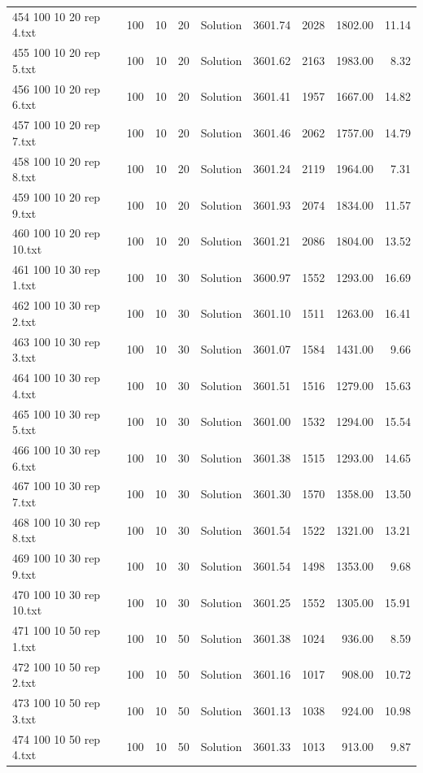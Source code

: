 \begin{longtable}{lrrllrrrr}
454 100 10 20 rep 4.txt & 100 & 10 & 20 & Solution & 3601.74 & 2028 & 1802.00 & 11.14\\
455 100 10 20 rep 5.txt & 100 & 10 & 20 & Solution & 3601.62 & 2163 & 1983.00 &  8.32\\
456 100 10 20 rep 6.txt & 100 & 10 & 20 & Solution & 3601.41 & 1957 & 1667.00 & 14.82\\
457 100 10 20 rep 7.txt & 100 & 10 & 20 & Solution & 3601.46 & 2062 & 1757.00 & 14.79\\
458 100 10 20 rep 8.txt & 100 & 10 & 20 & Solution & 3601.24 & 2119 & 1964.00 &  7.31\\
459 100 10 20 rep 9.txt & 100 & 10 & 20 & Solution & 3601.93 & 2074 & 1834.00 & 11.57\\
460 100 10 20 rep 10.txt & 100 & 10 & 20 & Solution & 3601.21 & 2086 & 1804.00 & 13.52\\
461 100 10 30 rep 1.txt & 100 & 10 & 30 & Solution & 3600.97 & 1552 & 1293.00 & 16.69\\
462 100 10 30 rep 2.txt & 100 & 10 & 30 & Solution & 3601.10 & 1511 & 1263.00 & 16.41\\
463 100 10 30 rep 3.txt & 100 & 10 & 30 & Solution & 3601.07 & 1584 & 1431.00 &  9.66\\
464 100 10 30 rep 4.txt & 100 & 10 & 30 & Solution & 3601.51 & 1516 & 1279.00 & 15.63\\
465 100 10 30 rep 5.txt & 100 & 10 & 30 & Solution & 3601.00 & 1532 & 1294.00 & 15.54\\
466 100 10 30 rep 6.txt & 100 & 10 & 30 & Solution & 3601.38 & 1515 & 1293.00 & 14.65\\
467 100 10 30 rep 7.txt & 100 & 10 & 30 & Solution & 3601.30 & 1570 & 1358.00 & 13.50\\
468 100 10 30 rep 8.txt & 100 & 10 & 30 & Solution & 3601.54 & 1522 & 1321.00 & 13.21\\
469 100 10 30 rep 9.txt & 100 & 10 & 30 & Solution & 3601.54 & 1498 & 1353.00 &  9.68\\
470 100 10 30 rep 10.txt & 100 & 10 & 30 & Solution & 3601.25 & 1552 & 1305.00 & 15.91\\
471 100 10 50 rep 1.txt & 100 & 10 & 50 & Solution & 3601.38 & 1024 & 936.00 &  8.59\\
472 100 10 50 rep 2.txt & 100 & 10 & 50 & Solution & 3601.16 & 1017 & 908.00 & 10.72\\
473 100 10 50 rep 3.txt & 100 & 10 & 50 & Solution & 3601.13 & 1038 & 924.00 & 10.98\\
474 100 10 50 rep 4.txt & 100 & 10 & 50 & Solution & 3601.33 & 1013 & 913.00 &  9.87\\

\end{longtable}
